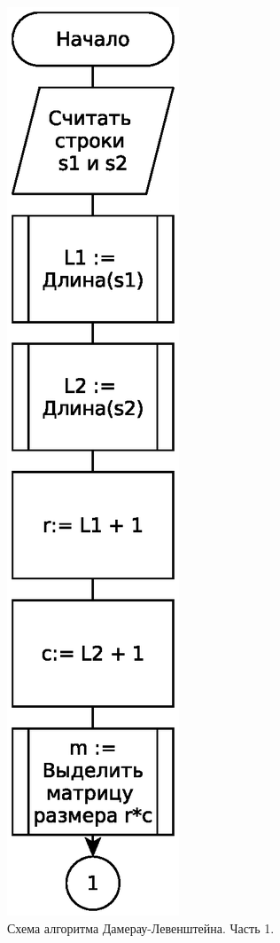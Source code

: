 \begin{figure}
    \centering
    \includegraphics[height=0.9\textheight]{schemes/levenshtein-damerau-eps-1}
    \caption{Схема алгоритма Дамерау-Левенштейна. Часть 1.}
    \label{levenshtein-damerau-scheme-part-1}
\end{figure}

